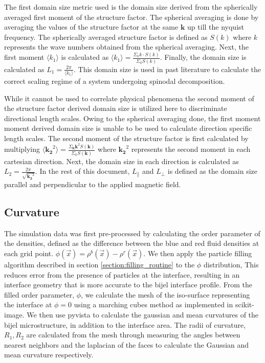 The first domain size metric used is the domain size derived from the spherically averaged first moment of the structure 
factor. The spherical averaging is done by averaging the values of the structure factor at the same $\mathbf{k}$ up 
till the nyquist frequency. The spherically averaged structure factor is defined as $S(k)$ where $k$ represents the 
wave numbers obtained from the spherical averaging. Next, the first moment $\langle k_1 \rangle$ is calculated as 
$\langle k_1 \rangle = \frac{\Sigma_{k} k\cdot S(k)}{\Sigma_{k} S(k)}$. Finally, the domain size is calculated as 
$L_1 = \frac{2 \pi}{\langle k_1 \rangle}$. \cite{kendon_inertial_2001,kendon_3d_1999} This domain size is used in past literature 
to calculate the correct scaling regime of a system undergoing spinodal decomposition. 

While it cannot be used to correlate physical phenomena the second moment of the structure factor derived domain 
size is utilized here to discriminate directional length scales. Owing to the spherical averaging done, the first 
moment moment derived domain size is unable to be used to calculate direction specific length scales. The second 
moment of the structure factor is first calculated by multiplying 
$\langle \mathbf{k_2}^2 \rangle = \frac{\Sigma_{\mathbf{k}} \mathbf{k}^2 S(\mathbf{k})}{\Sigma_k S(\mathbf{k})}$ 
where $\mathbf{k_2}^2$ represents the second moment in each cartesian direction. Next, the domain size in each 
direction is calculated as $L_2 = \frac{2 \pi}{\sqrt{\mathbf{k_2}^2}}$. \cite{jansen_bijels_2011, gunther_timescales_2014} 
In the rest of this document, $L_{\parallel}$ and $L_{\perp}$ is defined as the domain size parallel and perpendicular to 
the applied magnetic field.

\subsection{Curvature}
\label{section:curvature}

The simulation data was first pre-processed by calculating the order parameter of the densities, defined as the difference between the blue and red 
fluid densities at each grid point. $\phi(\vec{x}) = \rho^b(\vec{x}) - \rho^r(\vec{x})$. We then apply the particle filling algorithm described in 
section \ref{section:filling_routine} to the $\phi$ distribution, This reduces error from the presence of particles at the interface, 
resulting in an interface geometry that is more accurate to the bijel interface profile. From the filled order parameter, $\phi$, we calculate the mesh of 
the iso-surface representing the interface at $\phi = 0$ using a marching cubes method as implemented in scikit-image. We then use pyvista to calculate the 
gaussian and mean curvatures of the bijel microstructure, in addition to the interface area. The radii of curvature, $R_1, R_2$ are calculated from the 
mesh through measuring the angles between nearest neighbors and the laplacian of the faces to calculate the Gaussian and mean curvature respectively. 


